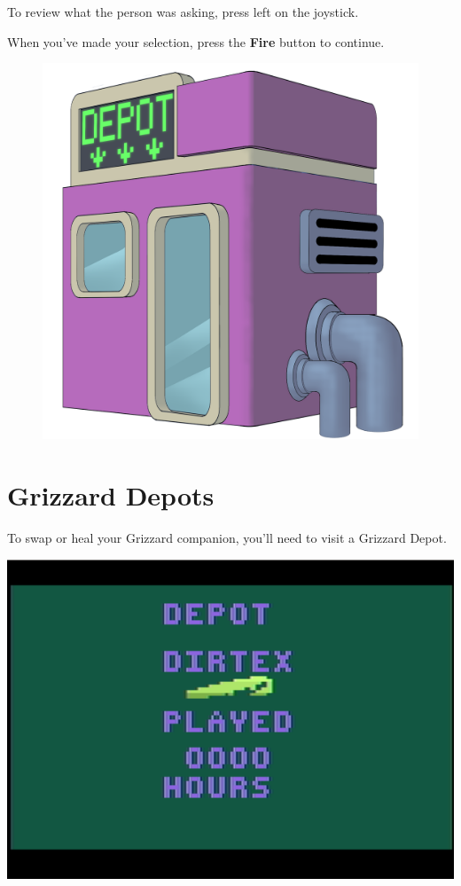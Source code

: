 \documentclass[9pt,twocolumn,openany,article]{memoir}
\begin{document}
To review  what  the  person  was  asking, press  left  on
the joystick.

When you've made your selection, press the \textbf{Fire} button to continue.

\begin{figure}[t]
  \begin{center}
    \includegraphics[width=1.6667\columnwidth]{../Manual/GrizzardDepot.png}
  \end{center}
\end{figure}

\section{Grizzard Depots}\label{sec:GrizzardDepot}

To  \ifdefined\NOSAVE\else swap  or  \fi heal  your Grizzard  companion,
you'll need to visit a Grizzard Depot.

\begin{center}
  \includegraphics[width=.75\columnwidth]{../Manual/DepotScreenshotNTSC.png}
\end{center}
\end{document}
